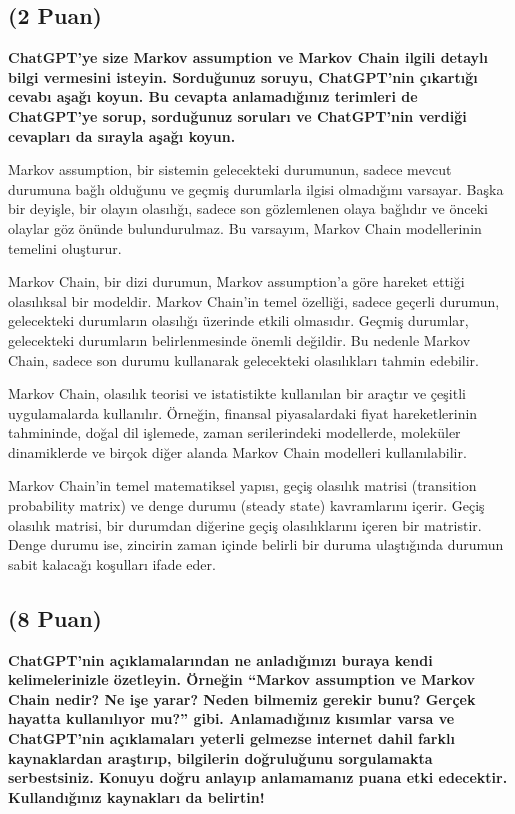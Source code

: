 \documentclass[11pt]{article}
\begin{document}
\subsection{(2 Puan)} \textbf{ChatGPT’ye size Markov assumption ve Markov Chain ilgili detaylı bilgi vermesini isteyin. Sorduğunuz soruyu, ChatGPT'nin çıkartığı cevabı aşağı koyun. Bu cevapta anlamadığınız terimleri de ChatGPT’ye sorup, sorduğunuz soruları ve ChatGPT’nin verdiği cevapları da sırayla aşağı koyun.}

Markov assumption, bir sistemin gelecekteki durumunun, sadece mevcut durumuna bağlı olduğunu ve geçmiş durumlarla ilgisi olmadığını varsayar. Başka bir deyişle, bir olayın olasılığı, sadece son gözlemlenen olaya bağlıdır ve önceki olaylar göz önünde bulundurulmaz. Bu varsayım, Markov Chain modellerinin temelini oluşturur.

Markov Chain, bir dizi durumun, Markov assumption'a göre hareket ettiği olasılıksal bir modeldir. Markov Chain'in temel özelliği, sadece geçerli durumun, gelecekteki durumların olasılığı üzerinde etkili olmasıdır. Geçmiş durumlar, gelecekteki durumların belirlenmesinde önemli değildir. Bu nedenle Markov Chain, sadece son durumu kullanarak gelecekteki olasılıkları tahmin edebilir.

Markov Chain, olasılık teorisi ve istatistikte kullanılan bir araçtır ve çeşitli uygulamalarda kullanılır. Örneğin, finansal piyasalardaki fiyat hareketlerinin tahmininde, doğal dil işlemede, zaman serilerindeki modellerde, moleküler dinamiklerde ve birçok diğer alanda Markov Chain modelleri kullanılabilir.

Markov Chain'in temel matematiksel yapısı, geçiş olasılık matrisi (transition probability matrix) ve denge durumu (steady state) kavramlarını içerir. Geçiş olasılık matrisi, bir durumdan diğerine geçiş olasılıklarını içeren bir matristir. Denge durumu ise, zincirin zaman içinde belirli bir duruma ulaştığında durumun sabit kalacağı koşulları ifade eder.

\subsection{(8 Puan)} \textbf{ChatGPT’nin açıklamalarından ne anladığınızı buraya kendi kelimelerinizle özetleyin. Örneğin ``Markov assumption ve Markov Chain nedir? Ne işe yarar? Neden bilmemiz gerekir bunu? Gerçek hayatta kullanılıyor mu?'' gibi. Anlamadığınız kısımlar varsa ve ChatGPT’nin açıklamaları yeterli gelmezse internet dahil farklı kaynaklardan araştırıp, bilgilerin doğruluğunu sorgulamakta serbestsiniz. Konuyu doğru anlayıp anlamamanız puana etki edecektir. Kullandığınız kaynakları da belirtin!}
\end{document}
